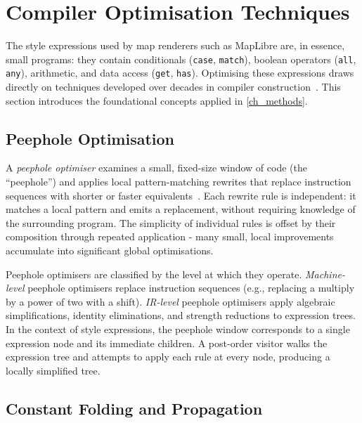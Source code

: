 \section{Compiler Optimisation Techniques}\label{sec_compiler_optimisations}

The style expressions used by map renderers such as MapLibre are, in essence, small programs: they contain conditionals (\texttt{case}, \texttt{match}), boolean operators (\texttt{all}, \texttt{any}), arithmetic, and data access (\texttt{get}, \texttt{has}).
Optimising these expressions draws directly on techniques developed over decades in compiler construction~\cite{ahoCompilersPrinciplesTechniques2007}.
This section introduces the foundational concepts applied in \cref{ch_methods}.

\subsection{Peephole Optimisation}

\begin{sloppypar}
A \emph{peephole optimiser} examines a small, fixed-size window of code (the \enquote{peephole}) and applies local pattern-matching rewrites that replace instruction sequences with shorter or faster equivalents~\cite{davidsonCodeSelectionObject1984}.
Each rewrite rule is independent: it matches a local pattern and emits a replacement, without requiring knowledge of the surrounding program.
The simplicity of individual rules is offset by their composition through repeated application - many small, local improvements accumulate into significant global optimisations.
\end{sloppypar}

Peephole optimisers are classified by the level at which they operate.
\emph{Machine-level} peephole optimisers replace instruction sequences (e.g., replacing a multiply by a power of two with a shift).
\emph{\ac{IR}-level} peephole optimisers apply algebraic simplifications, identity eliminations, and strength reductions to expression trees.
In the context of style expressions, the peephole window corresponds to a single expression node and its immediate children.
A post-order visitor walks the expression tree and attempts to apply each rule at every node, producing a locally simplified tree.

\subsection{Constant Folding and Propagation}

